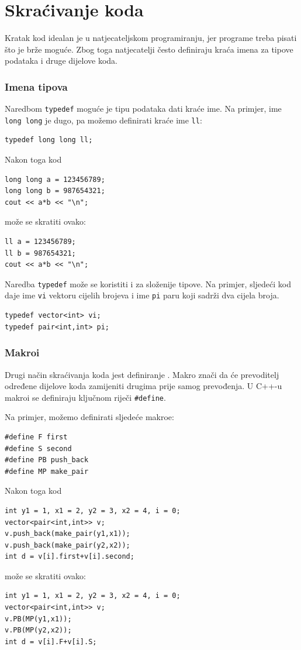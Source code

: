 \section{Skraćivanje koda}

Kratak kod idealan je u natjecateljskom programiranju,
jer programe treba pisati
što je brže moguće.
Zbog toga natjecatelji često definiraju
kraća imena za tipove podataka i druge dijelove koda.

\subsubsection{Imena tipova}
Naredbom \texttt{typedef}
moguće je tipu podataka dati
kraće ime.
Na primjer, ime \texttt{long long} je dugo,
pa možemo definirati kraće ime \texttt{ll}:
\begin{lstlisting}
typedef long long ll;
\end{lstlisting}
Nakon toga kod
\begin{lstlisting}
long long a = 123456789;
long long b = 987654321;
cout << a*b << "\n";
\end{lstlisting}
može se skratiti ovako:
\begin{lstlisting}
ll a = 123456789;
ll b = 987654321;
cout << a*b << "\n";
\end{lstlisting}

Naredba \texttt{typedef}
može se koristiti i za složenije tipove.
Na primjer, sljedeći kod daje
ime \texttt{vi} vektoru cijelih brojeva
i ime \texttt{pi} paru
koji sadrži dva cijela broja.
\begin{lstlisting}
typedef vector<int> vi;
typedef pair<int,int> pi;
\end{lstlisting}

\subsubsection{Makroi}
Drugi način skraćivanja koda jest definiranje
.
Makro znači da će prevoditelj određene dijelove
koda zamijeniti drugima prije samog prevođenja.
U C++-u makroi se definiraju
ključnom riječi \texttt{\#define}.

Na primjer, možemo definirati sljedeće makroe:
\begin{lstlisting}
#define F first
#define S second
#define PB push_back
#define MP make_pair
\end{lstlisting}
Nakon toga kod
\begin{lstlisting}
int y1 = 1, x1 = 2, y2 = 3, x2 = 4, i = 0;
vector<pair<int,int>> v;
v.push_back(make_pair(y1,x1));
v.push_back(make_pair(y2,x2));
int d = v[i].first+v[i].second;
\end{lstlisting}
može se skratiti ovako:
\begin{lstlisting}
int y1 = 1, x1 = 2, y2 = 3, x2 = 4, i = 0;
vector<pair<int,int>> v;
v.PB(MP(y1,x1));
v.PB(MP(y2,x2));
int d = v[i].F+v[i].S;
\end{lstlisting}

